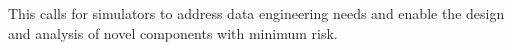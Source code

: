 \documentclass[sigconf]{acmart}
\begin{document}
This %
calls for simulators to address data engineering needs and enable the design and analysis of novel components with minimum risk.
\end{document}
